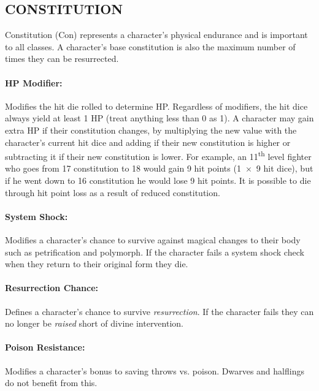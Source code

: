 \begin{multicols}{2}

\section{CONSTITUTION}

Constitution (Con) represents a character's physical endurance and is important to all classes.  A character's base constitution is also the maximum number of times they can be resurrected.

\paragraph{HP Modifier:}  Modifies the hit die rolled to determine HP.  Regardless of modifiers, the hit dice always yield at least 1 HP (treat anything less than 0 as 1).  A character may gain extra HP if their constitution changes, by multiplying the new value with the character's current hit dice and adding if their new constitution is higher or subtracting it if their new constitution is lower.  For example, an 11\textsuperscript{th} level fighter who goes from 17 constitution to 18 would gain 9 hit points (1~$\times$~9 hit dice), but if he went down to 16 constitution he would lose 9 hit points.  It is possible to die through hit point loss as a result of reduced constitution.

\paragraph{System Shock:}  Modifies a character's chance to survive against magical changes to their body such as petrification and polymorph.  If the character fails a system shock check when they return to their original form they die.

\paragraph{Resurrection Chance:}  Defines a character's chance to survive \textit{resurrection}.  If the character fails they can no longer be \textit{raised} short of divine intervention.

\paragraph{Poison Resistance:}  Modifies a character's bonus to saving throws vs. poison.  Dwarves and halflings do not benefit from this.


\end{multicols}
